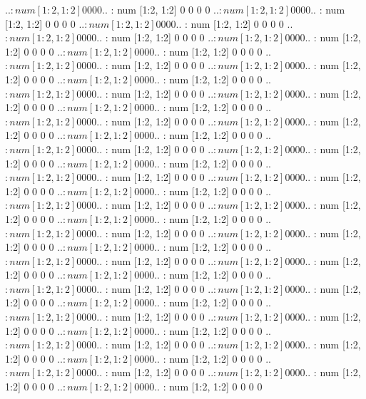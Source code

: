 \documentclass[11pt]{article} %
\begin{document}
\begin{Schunk}
\begin{Soutput}
  ..$ : num [1:2, 1:2] 0 0 0 0
  ..$ : num [1:2, 1:2] 0 0 0 0
  ..$ : num [1:2, 1:2] 0 0 0 0
  ..$ : num [1:2, 1:2] 0 0 0 0
  ..$ : num [1:2, 1:2] 0 0 0 0
  ..$ : num [1:2, 1:2] 0 0 0 0
  ..$ : num [1:2, 1:2] 0 0 0 0
  ..$ : num [1:2, 1:2] 0 0 0 0
  ..$ : num [1:2, 1:2] 0 0 0 0
  ..$ : num [1:2, 1:2] 0 0 0 0
  ..$ : num [1:2, 1:2] 0 0 0 0
  ..$ : num [1:2, 1:2] 0 0 0 0
  ..$ : num [1:2, 1:2] 0 0 0 0
  ..$ : num [1:2, 1:2] 0 0 0 0
  ..$ : num [1:2, 1:2] 0 0 0 0
  ..$ : num [1:2, 1:2] 0 0 0 0
  ..$ : num [1:2, 1:2] 0 0 0 0
  ..$ : num [1:2, 1:2] 0 0 0 0
  ..$ : num [1:2, 1:2] 0 0 0 0
  ..$ : num [1:2, 1:2] 0 0 0 0
  ..$ : num [1:2, 1:2] 0 0 0 0
  ..$ : num [1:2, 1:2] 0 0 0 0
  ..$ : num [1:2, 1:2] 0 0 0 0
  ..$ : num [1:2, 1:2] 0 0 0 0
  ..$ : num [1:2, 1:2] 0 0 0 0
  ..$ : num [1:2, 1:2] 0 0 0 0
  ..$ : num [1:2, 1:2] 0 0 0 0
  ..$ : num [1:2, 1:2] 0 0 0 0
  ..$ : num [1:2, 1:2] 0 0 0 0
  ..$ : num [1:2, 1:2] 0 0 0 0
  ..$ : num [1:2, 1:2] 0 0 0 0
  ..$ : num [1:2, 1:2] 0 0 0 0
  ..$ : num [1:2, 1:2] 0 0 0 0
  ..$ : num [1:2, 1:2] 0 0 0 0
  ..$ : num [1:2, 1:2] 0 0 0 0
  ..$ : num [1:2, 1:2] 0 0 0 0
  ..$ : num [1:2, 1:2] 0 0 0 0
  ..$ : num [1:2, 1:2] 0 0 0 0
  ..$ : num [1:2, 1:2] 0 0 0 0
  ..$ : num [1:2, 1:2] 0 0 0 0
  ..$ : num [1:2, 1:2] 0 0 0 0
  ..$ : num [1:2, 1:2] 0 0 0 0
  ..$ : num [1:2, 1:2] 0 0 0 0
  ..$ : num [1:2, 1:2] 0 0 0 0
  ..$ : num [1:2, 1:2] 0 0 0 0
  ..$ : num [1:2, 1:2] 0 0 0 0
  ..$ : num [1:2, 1:2] 0 0 0 0
  ..$ : num [1:2, 1:2] 0 0 0 0
  ..$ : num [1:2, 1:2] 0 0 0 0
  ..$ : num [1:2, 1:2] 0 0 0 0
  ..$ : num [1:2, 1:2] 0 0 0 0
  ..$ : num [1:2, 1:2] 0 0 0 0
  ..$ : num [1:2, 1:2] 0 0 0 0
  ..$ : num [1:2, 1:2] 0 0 0 0
  ..$ : num [1:2, 1:2] 0 0 0 0
  ..$ : num [1:2, 1:2] 0 0 0 0
  ..$ : num [1:2, 1:2] 0 0 0 0
  ..$ : num [1:2, 1:2] 0 0 0 0
  ..$ : num [1:2, 1:2] 0 0 0 0
  ..$ : num [1:2, 1:2] 0 0 0 0
  ..$ : num [1:2, 1:2] 0 0 0 0
  ..$ : num [1:2, 1:2] 0 0 0 0
  ..$ : num [1:2, 1:2] 0 0 0 0
  ..$ : num [1:2, 1:2] 0 0 0 0
  ..$ : num [1:2, 1:2] 0 0 0 0
  ..$ : num [1:2, 1:2] 0 0 0 0
  ..$ : num [1:2, 1:2] 0 0 0 0
  ..$ : num [1:2, 1:2] 0 0 0 0
  ..$ : num [1:2, 1:2] 0 0 0 0
  ..$ : num [1:2, 1:2] 0 0 0 0
  ..$ : num [1:2, 1:2] 0 0 0 0
  ..$ : num [1:2, 1:2] 0 0 0 0
  ..$ : num [1:2, 1:2] 0 0 0 0
  ..$ : num [1:2, 1:2] 0 0 0 0
  ..$ : num [1:2, 1:2] 0 0 0 0
  ..$ : num [1:2, 1:2] 0 0 0 0
  ..$ : num [1:2, 1:2] 0 0 0 0
  ..$ : num [1:2, 1:2] 0 0 0 0
  ..$ : num [1:2, 1:2] 0 0 0 0
  ..$ : num [1:2, 1:2] 0 0 0 0
  ..$ : num [1:2, 1:2] 0 0 0 0
  ..$ : num [1:2, 1:2] 0 0 0 0
  ..$ : num [1:2, 1:2] 0 0 0 0
  ..$ : num [1:2, 1:2] 0 0 0 0

\end{Soutput}
\end{Schunk}
\end{document}
